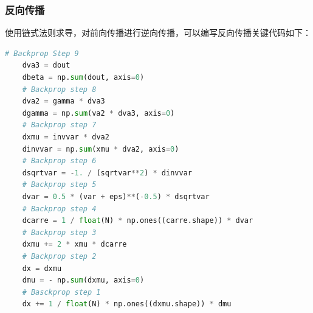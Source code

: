 \documentclass[withoutpreface,bwprint]{cumcmthesis} %
\begin{document}
\subsubsection{反向传播}
使用链式法则求导，对前向传播进行逆向传播，可以编写反向传播关键代码如下：
\begin{lstlisting}[language=python]
	# Backprop Step 9
	dva3 = dout
	dbeta = np.sum(dout, axis=0)
	# Backprop step 8
	dva2 = gamma * dva3
	dgamma = np.sum(va2 * dva3, axis=0)
	# Backprop step 7
	dxmu = invvar * dva2
	dinvvar = np.sum(xmu * dva2, axis=0)
	# Backprop step 6
	dsqrtvar = -1. / (sqrtvar**2) * dinvvar
	# Backprop step 5
	dvar = 0.5 * (var + eps)**(-0.5) * dsqrtvar
	# Backprop step 4
	dcarre = 1 / float(N) * np.ones((carre.shape)) * dvar
	# Backprop step 3
	dxmu += 2 * xmu * dcarre
	# Backprop step 2
	dx = dxmu
	dmu = - np.sum(dxmu, axis=0)
	# Basckprop step 1
	dx += 1 / float(N) * np.ones((dxmu.shape)) * dmu
\end{lstlisting}
\end{document}
